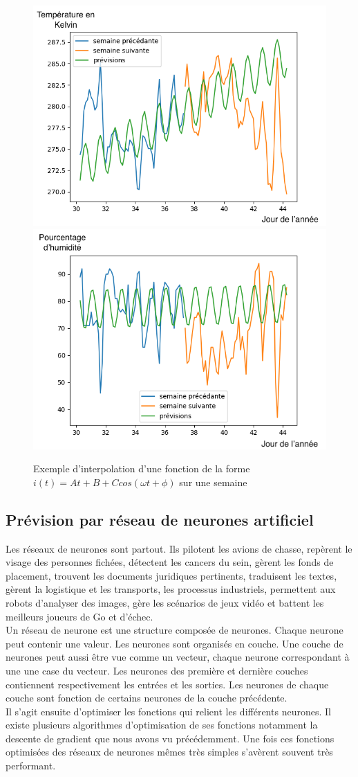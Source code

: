 \documentclass[11pt,a4paper]{article}
\begin{document}
\begin{figure} [H]
\centering
\includegraphics[width=0.48 \textwidth]{./imagesTIPE/cosDS.png}\quad
\includegraphics[width=0.48 \textwidth]{./imagesTIPE/cosDSH.png}
\caption{\label{fig:cosDS} Exemple d'interpolation d'une fonction de la forme $i(t) = At +B + C cos (\omega t + \phi)$ sur une semaine}
\end{figure}





\subsection {Prévision par réseau de neurones artificiel}
Les réseaux de neurones sont partout. Ils pilotent les avions de chasse, repèrent le visage des personnes fichées, détectent les cancers du sein, gèrent les fonds de placement, trouvent les documents juridiques pertinents, traduisent les textes, gèrent la logistique et les transports, les processus industriels, permettent aux robots d'analyser des images, gère les scénarios de jeux vidéo et battent les meilleurs joueurs de Go et d'échec.   \\
Un réseau de neurone est une structure composée de neurones. Chaque neurone peut contenir une valeur. Les neurones sont organisés en couche. Une couche de neurones peut aussi être vue comme un vecteur, chaque neurone correspondant à une une case du vecteur. Les neurones des première et dernière couches contiennent respectivement les entrées et les sorties. Les neurones de chaque couche sont fonction de certains neurones de la couche précédente. \\
Il s'agit ensuite d'optimiser les fonctions qui relient les différents neurones. Il existe plusieurs algorithmes d'optimisation de ses fonctions notamment la descente de gradient que nous avons vu précédemment. Une fois ces fonctions optimisées des réseaux de neurones mêmes très simples s'avèrent souvent très performant. \\
\end{document}
